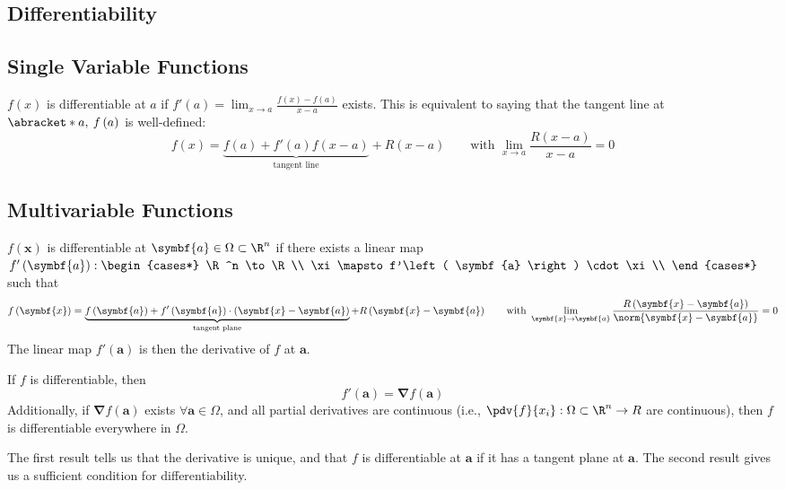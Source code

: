 \documentclass{article}
\begin{document}
\subsection{Differentiability}
\subsection{Single Variable Functions}
\(f\left( x \right)\) is differentiable at \(a\) if \(f'\left( a \right) = \lim_{x \to a} \frac{f\left( x \right) - f\left( a \right)}{x - a}\) exists.
This is equivalent to saying that the tangent line at \(\abracket*{a,\: f\left( a \right)}\) is well-defined:
\begin{equation*}
    f\left( x \right) = \underbrace{f\left( a \right) + f'\left( a \right) f\left( x - a \right)}_{\text{tangent line}} + R\left( x - a \right) \qquad \text{with } \lim_{x \to a} \frac{R\left( x - a \right)}{x - a} = 0
\end{equation*}
\subsection{Multivariable Functions}
\(f\left( \symbf{x} \right)\) is differentiable at \(\symbf{a} \in \Omega \subset \R^n\) if there exists a linear map \(f'\left( \symbf{a} \right) :
\begin{cases*}
    \R^n \to \R                                      \\
    \xi \mapsto f'\left( \symbf{a} \right) \cdot \xi \\
\end{cases*}
\) such that
\begin{equation*}
    f\left( \symbf{x} \right) = \underbrace{f\left( \symbf{a} \right) + f'\left( \symbf{a} \right) \cdot \left( \symbf{x} - \symbf{a} \right)}_{\text{tangent plane}} + R\left( \symbf{x} - \symbf{a} \right) \qquad \text{with } \lim_{\symbf{x} \to \symbf{a}} \frac{R\left( \symbf{x} - \symbf{a} \right)}{\norm{\symbf{x} - \symbf{a}}} = 0
\end{equation*}
The linear map \(f'\left( \symbf{a} \right)\) is then the derivative of \(f\) at \(\symbf{a}\).
\begin{theorem}
    If \(f\) is differentiable, then
    \begin{equation*}
        f'\left( \symbf{a} \right) = \symbf{\nabla} f\left( \symbf{a} \right)
    \end{equation*}
    Additionally, if \(\symbf{\nabla} f\left( \symbf{a} \right)\) exists
    \(\forall \symbf{a} \in \Omega\), and all partial derivatives are
    continuous (i.e., \(\pdv{f}{x_i} : \Omega \subset \R^n \to R\) are
    continuous), then \(f\) is differentiable everywhere in \(\Omega\).
\end{theorem}
The first result tells us that the derivative is unique, and that \(f\) is
differentiable at \(\symbf{a}\) if it has a tangent plane at \(\symbf{a}\).
The second result gives us a sufficient condition for differentiability.
\end{document}
